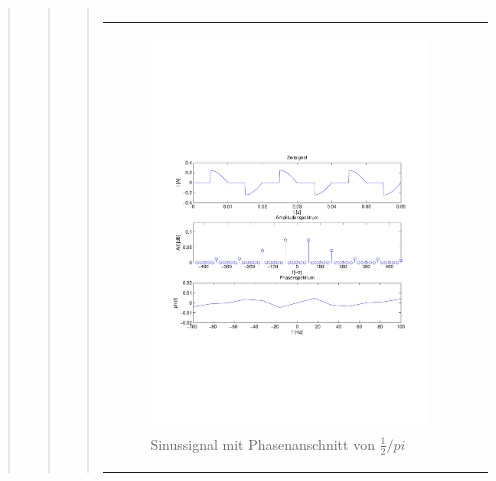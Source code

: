 \begin{quote}
\begin{quote}
\begin{quote}
\begin{center}
\begin{tabular}{ll}
                \end{tabular}
                \end{center}
    
                \begin{center}
                \begin{tabular}{ll}
    
                \hspace{-11em}
                    \begin{minipage}{0.6\textwidth}
    
                        \begin{figure}[H]
                            \label{fig:}
                            \includegraphics[scale=0.5, trim = 1.5cm 7cm 1.5cm 8.5cm,
                            clip]{./Bilder/Phasenanschnitt48pi.pdf} %
                            \caption{Sinussignal mit Phasenanschnitt von $\frac{1}{2}/pi$}
                        \end{figure}
    

\end{minipage}
\end{tabular}
\end{center}
\end{quote}
\end{quote}
\end{quote}

